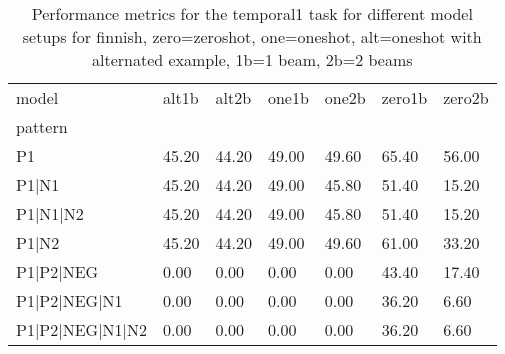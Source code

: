 \begin{table}[h]
\begin{tabular}{l|llllll}
\toprule
model & alt1b & alt2b & one1b & one2b & zero1b & zero2b \\
pattern &  &  &  &  &  &  \\
\midrule
P1 & 45.20 & 44.20 & 49.00 & 49.60 & 65.40 & 56.00 \\
P1|N1 & 45.20 & 44.20 & 49.00 & 45.80 & 51.40 & 15.20 \\
P1|N1|N2 & 45.20 & 44.20 & 49.00 & 45.80 & 51.40 & 15.20 \\
P1|N2 & 45.20 & 44.20 & 49.00 & 49.60 & 61.00 & 33.20 \\
P1|P2|NEG & 0.00 & 0.00 & 0.00 & 0.00 & 43.40 & 17.40 \\
P1|P2|NEG|N1 & 0.00 & 0.00 & 0.00 & 0.00 & 36.20 & 6.60 \\
P1|P2|NEG|N1|N2 & 0.00 & 0.00 & 0.00 & 0.00 & 36.20 & 6.60 \\
\bottomrule
\end{tabular}
\caption{Performance metrics for the temporal1 task for different model setups for finnish, zero=zeroshot, one=oneshot, alt=oneshot with alternated example, 1b=1 beam, 2b=2 beams}
\label{tab:fi_temporal1_performance}
\end{table}
